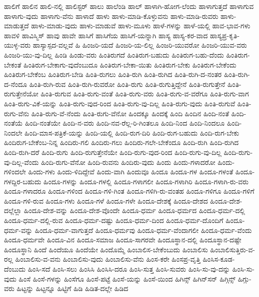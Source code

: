 {ಹಾಲಿಗೆ
ಹಾಲಿನ
ಹಾಲಿ-ನಲ್ಲಿ
ಹಾಲಿಸ್ಟರ್
ಹಾಲು
ಹಾಲೆಂಡಿ
ಹಾಲ್
ಹಾಳಾಗಿ-ಹೋಗ-ಲೆಂದು
ಹಾಳಾಗುತ್ತದೆ
ಹಾಳಾಗುವ
ಹಾಳಾಗು-ವುದು
ಹಾಳಾಗು-ವೆನು
ಹಾಳಾದೆ
ಹಾಳು
ಹಾಳು-ಮಾಡಿ-ಕೊಳ್ಳುವನು
ಹಾಳು-ಮಾಡಿ-ರುವರು
ಹಾಳು-ಮಾಡುತ್ತದೆ
ಹಾಳು-ಮಾಡು-ವುದು
ಹಾಳು-ಮಾಡುವೆ
ಹಾಳು-ಮೂಳು
ಹಾಳೆ-ಗಳನ್ನು
ಹಾಳೆ-ಯಲ್ಲಿ
ಹಾವ-ಭಾವ-ಗಳು
ಹಾವಳಿ
ಹಾವಿಸ್ಮಿಸ್
ಹಾವು
ಹಾವೇ
ಹಾಸಿಗೆ
ಹಾಸಿಗೆಯ
ಹಾಸಿಗೆ-ಯನ್ನಾಗಿ
ಹಾಸ್ಯ
ಹಾಸ್ಯ-ಕರ-ವಾದ
ಹಾಸ್ಯಪ್ರ-ಕೃತಿ-ಯುಳ್ಳ-ವರು
ಹಾಸ್ಯಾಸ್ಪದ-ವಲ್ಲವೆ
ಹಿ
ಹಿಂಜರಿ-ಯದೆ
ಹಿಂಜರಿ-ಯ-ಲಿಲ್ಲ
ಹಿಂಜರಿ-ಯುವರೋ
ಹಿಂಜರಿ-ಯುವ-ವರು
ಹಿಂಜರಿ-ಯು-ವು-ದಿಲ್ಲ
ಹಿಂಡಿ
ಹಿಂಡು-ವರು
ಹಿಂತಿರುಗದೆ
ಹಿಂತಿರುಗ-ಬಹುದು
ಹಿಂತಿರುಗ-ಬಹು-ದೆಂದು
ಹಿಂತಿರುಗ-ಬೇಕಂತೆ
ಹಿಂತಿರುಗ-ಬೇಕಾಗು-ವುದೆಂಬುದೂ
ಹಿಂತಿರುಗ-ಬೇಕಾ-ಯಿತು
ಹಿಂತಿರುಗ-ಬೇಕು
ಹಿಂತಿರುಗ-ಬೇಕೆಂದು
ಹಿಂತಿರುಗ-ಬೇಕೆಂಬ
ಹಿಂತಿರುಗ-ಬೇಡಿ
ಹಿಂತಿ-ರುಗಲು
ಹಿಂತಿ-ರುಗಿ
ಹಿಂತಿ-ರುಗಿದ
ಹಿಂತಿ-ರುಗಿ-ದ-ನಂತರ
ಹಿಂತಿ-ರುಗಿ-ದ-ನೆಂದೂ
ಹಿಂತಿ-ರುಗಿ-ರುವ
ಹಿಂತಿ-ರುಗಿ-ರುವರೋ
ಹಿಂತಿ-ರುಗು
ಹಿಂತಿ-ರುಗುತ್ತಿದ್ದೇನೆ
ಹಿಂತಿ-ರುಗುತ್ತೇನೆ
ಹಿಂತಿ-ರುಗುತ್ತೇನೆಯೋ
ಹಿಂತಿ-ರುಗುವ
ಹಿಂತಿ-ರುಗು-ವಂತೆ
ಹಿಂತಿ-ರುಗು-ವರು
ಹಿಂತಿ-ರುಗು-ವ-ವರೆಗೂ
ಹಿಂತಿ-ರುಗು-ವಾಗ
ಹಿಂತಿ-ರುಗು-ವಿಕೆ-ಯನ್ನು
ಹಿಂತಿ-ರುಗು-ವುದ-ರಿಂದ
ಹಿಂತಿ-ರುಗು-ವು-ದಿಲ್ಲ
ಹಿಂತಿ-ರುಗು-ವುದು
ಹಿಂತಿ-ರುಗುವೆ
ಹಿಂತಿ-ರುಗು-ವೆನು
ಹಿಂತಿ-ರುಗು-ವೆ-ನೆಂದು
ಹಿಂತಿ-ರುಗು-ವೆನೋ
ಹಿಂದಕ್ಕೂ
ಹಿಂದಕ್ಕೆ
ಹಿಂದಿ
ಹಿಂದಿನ
ಹಿಂದಿ-ನಂತೆ
ಹಿಂದಿ-ನಂತೆಯೆ
ಹಿಂದಿ-ನಂತೆಯೇ
ಹಿಂದಿ-ನ-ವರು
ಹಿಂದಿ-ನವ-ರೆಲ್ಲ-ರಿ-ಗಿಂತಲೂ
ಹಿಂದಿ-ನಿಂದ
ಹಿಂದಿ-ನಿಂದಲೂ
ಹಿಂದಿ-ನಿಂದಲೇ
ಹಿಂದಿ-ಮಾಸ-ಪತ್ರಿಕೆ-ಯನ್ನು
ಹಿಂದಿ-ಯಲ್ಲಿ
ಹಿಂದಿ-ರುಗ-ದಿರಿ
ಹಿಂದಿ-ರುಗ-ಬಹುದು
ಹಿಂದಿ-ರುಗ-ಬೇಕು
ಹಿಂದಿರುಗ-ಬೇಕೆಂಬ-ನಿನ್ನ
ಹಿಂದಿರು-ಗಲಿ
ಹಿಂದಿರು-ಗಲು
ಹಿಂದಿರು-ಗಲೇ-ಬೇಕೆಂದೂ
ಹಿಂದಿ-ರುಗಿ
ಹಿಂದಿ-ರುಗಿದ
ಹಿಂದಿ-ರುಗಿ-ದರೆ
ಹಿಂದಿ-ರುಗು
ಹಿಂದಿ-ರುಗುತ್ತೇನೆಯೇ
ಹಿಂದಿ-ರುಗು-ವುದ-ರಿಂದ
ಹಿಂದಿ-ರುಗು-ವು-ದಿಲ್ಲ
ಹಿಂದಿ-ರುಗು-ವು-ದಿಲ್ಲ-ವೆಂದು
ಹಿಂದಿ-ರುಗು-ವೆನೋ
ಹಿಂದಿ-ರುವನು
ಹಿಂದಿರು-ವುದು
ಹಿಂದು
ಹಿಂದು-ಗಳಾದರೋ
ಹಿಂದು-ಗಳಿಂದಲೇ
ಹಿಂದು-ಗಳು
ಹಿಂದು-ಳಿದಿದ್ದೇವೆ
ಹಿಂದು-ವಾಗಿ
ಹಿಂದುವೂ
ಹಿಂದೂ
ಹಿಂದೂ-ಗಳ
ಹಿಂದೂ-ಗಳಂತೆ
ಹಿಂದೂ-ಗಳದ್ದಿರ-ಬಹುದು
ಹಿಂದೂ-ಗಳನ್ನು
ಹಿಂದೂ-ಗಳಲ್ಲಿ
ಹಿಂದೂ-ಗಳಾಗಲೀ
ಹಿಂದೂ-ಗಳಾಗಿರಿ
ಹಿಂದೂ-ಗಳಾಗಿ-ರು-ವರು
ಹಿಂದೂ-ಗಳಾದರೂ
ಹಿಂದೂ-ಗಳಿಂದ
ಹಿಂದೂ-ಗಳಿ-ಗಿಂತ
ಹಿಂದೂ-ಗಳಿಗಿ-ರು-ವಂತಹ
ಹಿಂದೂ-ಗಳಿಗೂ
ಹಿಂದೂ-ಗಳಿಗೆ
ಹಿಂದೂ-ಗಳಿ-ರುವ
ಹಿಂದೂ-ಗಳು
ಹಿಂದೂ-ಗಳೆ
ಹಿಂದೂ-ಗಳೇ
ಹಿಂದೂ-ದೇಶಕ್ಕೆ
ಹಿಂದೂ-ದೇಶದ
ಹಿಂದೂ-ದೇಶ-ದಲ್ಲೆಲ್ಲಾ
ಹಿಂದೂ-ದೇಶ-ವನ್ನು
ಹಿಂದೂ-ದೇಶ-ವೊಂದೇ
ಹಿಂದೂ-ಧರ್ಮ
ಹಿಂದೂ-ಧರ್ಮದ
ಹಿಂದೂ-ಧರ್ಮ-ದಲ್ಲಿ
ಹಿಂದೂ-ಧರ್ಮ-ದಲ್ಲಿ-ರುವ
ಹಿಂದೂ-ಧರ್ಮ-ದಷ್ಟು
ಹಿಂದೂ-ಧರ್ಮ-ದಿಂದ
ಹಿಂದೂ-ಧರ್ಮ-ದೊಂದಿಗೆ
ಹಿಂದೂ-ಧರ್ಮ-ವನ್ನು
ಹಿಂದೂ-ಧರ್ಮ-ವಾಗುತ್ತದೆ
ಹಿಂದೂ-ಧರ್ಮವು
ಹಿಂದೂ-ಧರ್ಮ-ವೆಂದಾಗಲೀ
ಹಿಂದೂ-ಧರ್ಮ-ವೆಂದು
ಹಿಂದೂ-ಧರ್ಮವೇ
ಹಿಂದೂ-ವಿನ
ಹಿಂದೂ-ಸಮಾಜ
ಹಿಂದೂ-ಸಾಗರವೇ
ಹಿಂದೂಸ್ಥಾನ-ದಲ್ಲಿ
ಹಿಂದೂಸ್ಥಾನ-ದಷ್ಟೇ
ಹಿಂದೂಸ್ಥಾನಿ
ಹಿಂದೆ
ಹಿಂದೆಯೂ
ಹಿಂದೆಯೇ
ಹಿಂದೊಮ್ಮೆ
ಹಿಂಬಾಲಿಸ-ಬೇಕೆಂಬುದು
ಹಿಂಬಾಲಿಸು
ಹಿಂಬಾಲಿಸುತ್ತಿರು-ವ-ರಲ್ಲ
ಹಿಂಬಾಲಿಸು-ವ-ವನು
ಹಿಂಬಾಲಿಸು-ವುದು
ಹಿಂಬಾಲಿಸು-ವೆನು
ಹಿಂಸ-ಕರೇ
ಹಿಂಸಪ್ರ-ವೃತ್ತಿ
ಹಿಂಸಿಸ-ಕೂಡ-ದೆಂಬುದು
ಹಿಂಸಿ-ಸದೆ
ಹಿಂಸಿ-ಸಲು
ಹಿಂಸಿಸಿ
ಹಿಂಸಿಸಿ-ದರೂ
ಹಿಂಸಿ-ಸುತ್ತ
ಹಿಂಸಿ-ಸುವರು
ಹಿಂಸಿ-ಸು-ವು-ದನ್ನು
ಹಿಂಸಿ-ಸು-ವುದು
ಹಿಂಸೆ
ಹಿಂಸೆ-ಗಳನ್ನು
ಹಿಂಸೆಗೂ
ಹಿಂಸೆ-ಪಟ್ಟೆ
ಹಿಂಸೆ-ಯನ್ನು
ಹಿಂಸೆ-ಯಿಂದ
ಹಿಗಿನ್ಸ್
ಹಿಗಿನ್‌ಸನ್
ಹಿಗ್ಗಿನ್ಸ್
ಹಿಗ್ಗು-ವರು
ಹಿಟ್ಟನ್ನು
ಹಿಟ್ಟನ್ನೂ
ಹಿಟ್ಟಿಗೆ
ಹಿಡಿ
ಹಿಡಿತ-ದಲ್ಲೇ
ಹಿಡಿದ
}
